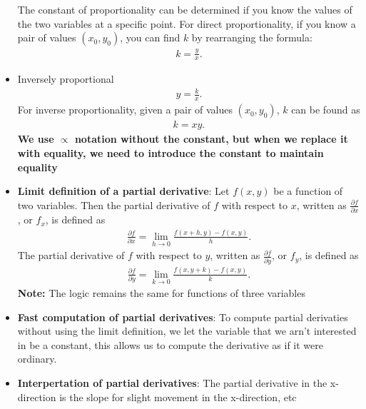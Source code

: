 \documentclass{report}
\begin{document}
\begin{itemize}
\begin{itemize}
                \end{itemize}
                The constant of proportionality can be determined if you know the values of the two variables at a specific point. For direct proportionality, if you know a pair of values $(x_{0}, y_{0}) $, you can find  $k$ by rearranging the formula:
                \begin{align*}
                    k = \frac{y}{x}
                .\end{align*}
                \item Inversely proportional
                \begin{align*}
                    y = \frac{k}{x}
                .\end{align*}
                For inverse proportionality, given a pair of values $(x_{0}, y_{0})$, $k$ can be found as 
                \begin{align*}
                    k=xy
                .\end{align*}
                \bigbreak \noindent 
                \textbf{We use $\propto$ notation without the constant, but when we replace it with equality, we need to introduce the constant to maintain equality}
            \item \textbf{Limit definition of a partial derivative}:
                Let $f(x,y)$ be a function of two variables. Then the partial derivative of $f$ with respect to $x$, written as $\frac{\partial f}{\partial x}$, or $f_x$, is defined as
                \begin{align*}
                    \frac{\partial f}{\partial x} = \lim_{h \to 0} \frac{f(x+h,y) - f(x,y)}{h}
                .\end{align*}
                The partial derivative of $f$ with respect to $y$, written as $\frac{\partial f}{\partial y}$, or $f_y$, is defined as
                \begin{align*}
                    \frac{\partial f}{\partial y} = \lim_{k \to 0} \frac{f(x,y+k) - f(x,y)}{k}
                .\end{align*}
                \bigbreak \noindent 
                \textbf{Note:} The logic remains the same for functions of three variables
            \item \textbf{Fast computation of partial derivatives}: To compute partial derivaties without using the limit definition, we let the variable that we arn't interested in be a constant, this allows us to compute the derivative as if it were ordinary.
            \item \textbf{Interpertation of partial derivatives}: The partial derivative in the x-direction is the slope for slight movement in the x-direction, etc

\end{itemize}
\end{document}

